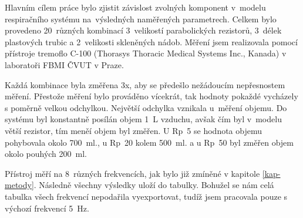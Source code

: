 Hlavním cílem práce bylo zjistit závislost zvolných komponent v~modelu respiračního systému na~výsledných naměřených parametrech.  Celkem bylo provedeno 20~různých kombinací 3~velikostí parabolických rezistorů, 3~délek plastových trubic a 2~velikosti skleněných nádob. Měření jsem realizovala pomocí přístroje tremoflo C-100 (Thorasys Thoracic Medical Systems Inc., Kanada) v laboratoři FBMI ČVUT v Praze. 

Každá kombinace byla změřena 3x, aby se předešlo nežádoucím nepřesnostem měření. Přestože měření bylo prováděno vícekrát, tak hodnoty pokaždé vycházely s poměrně velkou odchylkou. Největší odchylka vznikala u~měření objemu. Do systému byl konstantně posílán objem 1~L vzduchu, avšak čím byl v~modelu větší rezistor,  tím meněí objem byl změřen. U Rp~5 se hodnota objemu pohybovala okolo  \SI{700}{ml}., u Rp~20 kolem  \SI{500}{ml}. a u Rp~50 byl změřen objem okolo pouhých \SI{200}{ml}.

Přístroj měří na 8~různých frekvencích, jak bylo již zmíněné v kapitole \ref{kap-metody}. Následně všechny výsledky uloží do tabulky. Bohužel se nám celá tabulka všech frekvencí nepodařila vyexportovat, tudíž jsem pracovala pouze s výchozí frekvencí  \SI{5}{Hz}. 
